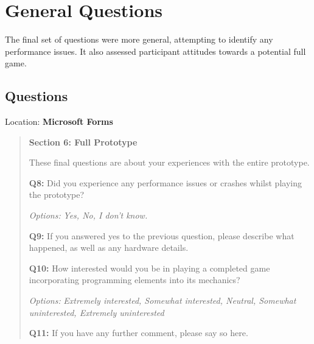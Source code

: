 \section{General Questions}

The final set of questions were more general, attempting to identify any performance issues. It also assessed participant attitudes towards a potential full game.

\subsection{Questions}

Location: \textbf{Microsoft Forms}

\begin{fullwidth}
    \begin{quote}
        \textbf{Section 6: Full Prototype}
    
        These final questions are about your experiences with the entire prototype.

        \textbf{Q8:} Did you experience any performance issues or crashes whilst playing the prototype?

        \textit{Options:}
        \textit{Yes, No, I don't know.}

        \textbf{Q9:} If you answered yes to the previous question, please describe what happened, as well as any hardware details.

        \textbf{Q10:} How interested would you be in playing a completed game incorporating programming elements into its mechanics?

        \textit{Options:}
        \textit{Extremely interested, Somewhat interested, Neutral, Somewhat uninterested, Extremely uninterested}

        \textbf{Q11:} If you have any further comment, please say so here.
    \end{quote}
\end{fullwidth}